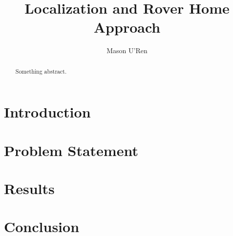 \documentclass[letterpaper, 10pt, conference]{ieeeconf}
\title{Localization and Rover Home Approach}
\author{Mason U'Ren}
\begin{document}
	
	\maketitle
	
	\begin{abstract}
		Something abstract.
	\end{abstract}


\section{Introduction}


\section{Problem Statement}

\section{Results}


\section{Conclusion}




\end{document}
